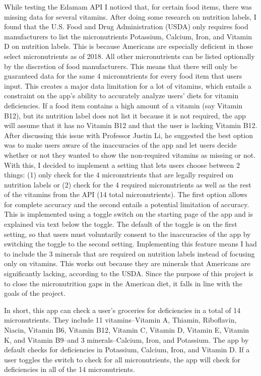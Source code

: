 \documentclass[10pt,twocolumn]{article}
\begin{document}
While testing the Edamam API I noticed that, for certain food items, there was missing data for several vitamins. After doing some research on nutrition labels, I found that the U.S. Food and Drug Administration (USDA) only requires food manufacturers to list the micronutrients Potassium, Calcium, Iron, and Vitamin D on nutrition labels.\cite{USDA} This is because Americans are especially deficient in those select micronutrients as of 2018. All other micronutrients can be listed optionally by the discretion of food manufacturers. This means that there will only be guaranteed data for the same 4 micronutrients for every food item that users input. This creates a major data limitation for a lot of vitamins, which entails a constraint on the app’s ability to accurately analyze users’ diets for vitamin deficiencies. If a food item contains a high amount of a vitamin (say Vitamin B12), but its nutrition label does not list it because it is not required, the app will assume that it has no Vitamin B12 and that the user is lacking Vitamin B12. After discussing this issue with Professor Justin Li, he suggested the best option was to make users aware of the inaccuracies of the app and let users decide whether or not they wanted to show the non-required vitamins as missing or not. With this, I decided to implement a setting that lets users choose between 2 things: (1) only check for the 4 micronutrients that are legally required on nutrition labels or (2) check for the 4 required micronutrients as well as the rest of the vitamins from the API (14 total micronutrients). The first option allows for complete accuracy and the second entails a potential limitation of accuracy. This is implemented using a toggle switch on the starting page of the app and is explained via text below the toggle. The default of the toggle is on the first setting, so that users must voluntarily consent to the inaccuracies of the app by switching the toggle to the second setting. Implementing this feature means I had to include the 3 minerals that are required on nutrition labels instead of focusing only on vitamins. This works out because they are minerals that Americans are significantly lacking, according to the USDA.\cite{USDA} Since the purpose of this project is to close the micronutrition gaps in the American diet, it falls in line with the goals of the project.

In short, this app can check a user's groceries for deficiencies in a total of 14 micronutrients. They include 11 vitamins–Vitamin A, Thiamin, Riboflavin, Niacin, Vitamin B6, Vitamin B12, Vitamin C, Vitamin D, Vitamin E, Vitamin K, and Vitamin B9–and 3 minerals–Calcium, Iron, and Potassium. The app by default checks for deficiencies in Potassium, Calcium, Iron, and Vitamin D. If a user toggles the switch to check for all micronutrients, the app will check for deficiencies in all of the 14 micronutrients. 
\end{document}
